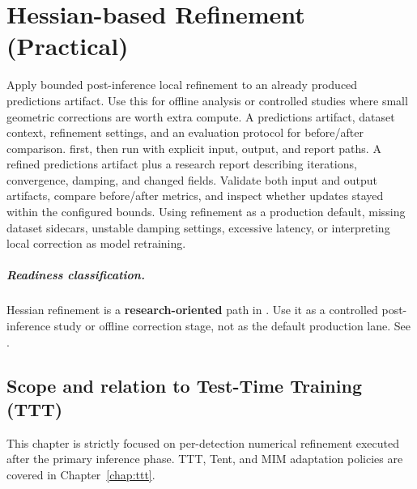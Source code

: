 \chapter{Hessian-based Refinement (Practical)}


\WorkflowOpening
{Apply bounded post-inference local refinement to an already produced predictions artifact.}
{Use this for offline analysis or controlled studies where small geometric corrections are worth extra compute.}
{A predictions artifact, dataset context, refinement settings, and an evaluation protocol for before/after comparison.}
{ first, then run with explicit input, output, and report paths.}
{A refined predictions artifact plus a research report describing iterations, convergence, damping, and changed fields.}
{Validate both input and output artifacts, compare before/after metrics, and inspect whether updates stayed within the configured bounds.}
{Using refinement as a production default, missing dataset sidecars, unstable damping settings, excessive latency, or interpreting local correction as model retraining.}

\paragraph{Readiness classification.}
Hessian refinement is a \textbf{research-oriented} path in \yolozu{}.
Use it as a controlled post-inference study or offline correction stage, not as the default production lane.
See .


\section{Scope and relation to Test-Time Training (TTT)}
This chapter is strictly focused on per-detection numerical refinement executed after the primary inference phase. TTT, Tent, and MIM adaptation policies are covered in Chapter~\ref{chap:ttt}.

